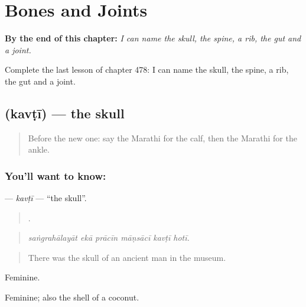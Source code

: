 
\chapter{Bones and Joints}
\label{ch:mr-bones-and-joints}

\begin{chapteropening}
\textbf{By the end of this chapter:} \emph{I can name the skull, the spine, a rib, the gut and a joint.}

Complete the last lesson of chapter 478: I can name the skull, the spine, a rib, the gut and a joint.
\end{chapteropening}

\section[\texorpdfstring{\mr{कवटी} (kavṭī)}{कवटी (kavṭī)}]{ (kavṭī) — the skull}

\label{lesson:MR-C478-kavti}



\begin{quote}
Before the new one: say the Marathi for the calf, then the Marathi for the ankle.
\end{quote}

\subsection*{You'll want to know: }
\textbf{} — \emph{kavṭī} — \textquotedblleft{}the skull\textquotedblright{}.

\begin{quote}
     .
\end{quote}

\begin{quote}
\emph{saṅgrahālayāt ekā prācīn māṇsācī kavṭī hotī.}
\end{quote}

\begin{quote}
There was the skull of an ancient man in the museum.
\end{quote}

Feminine.

Feminine; also the shell of a coconut.

